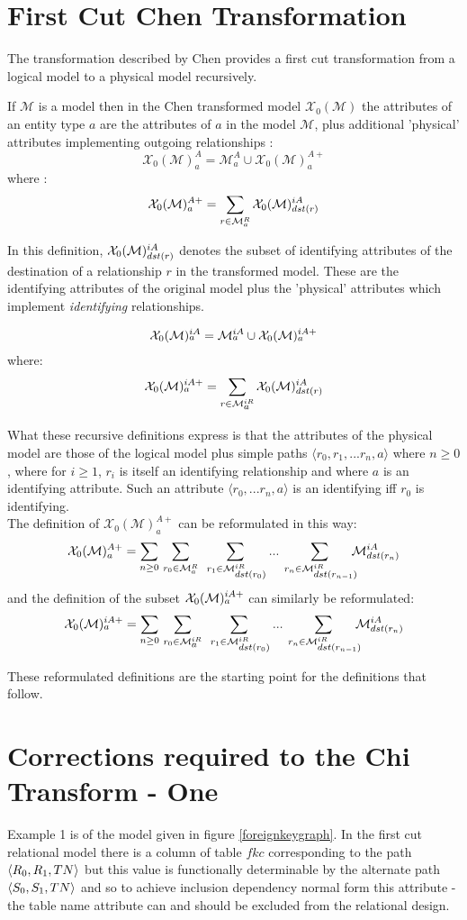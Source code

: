\documentclass[10pt,a4paper]{article}
\newcommand{\genericmodel}{\mathcal{M}}
\newcommand{\chen}{\mathcal{X}_0}
\newcommand{\chengenericmodel}{\chen(\genericmodel)}
\newcommand{\allAttrs}{\genericmodel^A}
\newcommand{\allRels}{\genericmodel^R}
\newcommand{\attrs}[1]{\allAttrs_{#1}}
\newcommand{\rels}[1]{\allRels_{#1}}
\newcommand{\allIdAttrs}{\genericmodel^{iA}}
\newcommand{\allIdRels}{\genericmodel^{iR}}
\newcommand{\idAttrs}[1]{\allIdAttrs_{\raisebox{2pt}{$\scriptstyle{#1}$}}}
\newcommand{\idRels}[1]{\allIdRels_{\raisebox{2pt}{$\scriptstyle{#1}$}}}
\newcommand{\chenAttrs}[1]{\chen(\genericmodel)^A_{#1}}
\newcommand{\chenFKattrs}[1]{\chen(\genericmodel)^{A+}_{#1}}
\newcommand{\chenIdAttrs}[1]{\chen(\genericmodel)^{iA}_{\raisebox{2pt}{$\scriptstyle{#1}$}}}
\newcommand{\chenFKidAttrs}[1]{\chen(\genericmodel)^{iA+}_{\raisebox{2pt}{$\scriptstyle{#1}$}}}
\begin{document}
\section{First Cut Chen Transformation}
\noindent The transformation described by Chen provides a  first cut transformation from a logical model to a physical model recursively.

\noindent If $\genericmodel$ is a model then in the Chen transformed model $\chengenericmodel$ 
the attributes of an entity type $a$ are the attributes of $a$ in the model $\genericmodel$,  plus additional 'physical' attributes implementing outgoing relationships :
\noindent
$$
\chenAttrs{a} = \attrs{a} \cup \chenFKattrs{a}
$$
\noindent
where :
$$
\chenFKattrs{a} = \sum_{r \in \rels{a}}{\chenIdAttrs{dst(r)}}
$$

\noindent In this definition, $\chenIdAttrs{dst(r)}$ denotes the subset of identifying attributes of the destination of
a relationship $r$ in the transformed model. These are the identifying attributes of the original model plus the 'physical' attributes which implement \textit{identifying} relationships.

$$
\chenIdAttrs{a} = \idAttrs{a}  \cup \chenFKidAttrs{a}
$$
where:
$$
\chenFKidAttrs{a} = \sum_{r \in \idRels{a}}{\chenIdAttrs{dst(r)}}
$$


\noindent What these recursive definitions express is that the attributes of the physical model are those of the logical model plus simple paths $\langle r_0,r_1,...r_n,a \rangle$ where $n \geq 0$,  where for $i \geq 1$,  $r_i$ is itself an identifying relationship and  where
$a$ is an identifying attribute. Such an attribute $\langle r_0,...r_n, a \rangle$  is an identifying iff  $r_0$ is identifying.\\


\noindent The definition of $\chenFKattrs{a}$ can be reformulated in this way:
$$
\chenFKattrs{a}=\sum_{n \geq 0} \, \sum_{r_0 \in \rels{a}} \; \sum_{\; r_1 \in \idRels{dst(r_0)}}...\sum_{\;r_n \in \idRels{dst(r_{n-1})}}\!\!\!\!\idAttrs{dst(r_n)}
$$
and the definition of the subset $\chenFKidAttrs{a}$ can similarly be reformulated:
$$
\chenFKidAttrs{a} = \sum_{n \geq 0} \, \sum_{r_0 \in \idRels{a}} \; \sum_{\; r_1 \in \idRels{dst(r_0)}}...\sum_{\;r_n \in \idRels{dst(r_{n-1})}}\!\!\!\!\idAttrs{dst(r_n)}
$$

\noindent These reformulated definitions are the starting point for the definitions that follow.

\section{Corrections required to the Chi Transform - One}
Example 1 is of the model given in figure \ref{foreignkeygraph}. In the first cut  relational model 
there is a column of table $fkc$ corresponding to the path $\langle R_0,R_1,TN\rangle$ but this value is functionally
determinable by the alternate path $\langle S_0,S_1,TN\rangle$ and so to achieve inclusion dependency normal form this 
attribute - the table name attribute can and should be excluded from the relational design.
\end{document}
